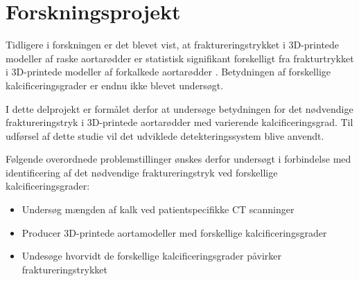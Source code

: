 \section{Forskningsprojekt}
Tidligere i forskningen er det blevet vist, at fraktureringstrykket i 3D-printede modeller af raske aortarødder er statistisk signifikant forskelligt fra frakturtrykket i 3D-printede modeller af forkalkede aortarødder \cite{rapport}. Betydningen af forskellige kalcificeringsgrader er endnu ikke blevet undersøgt. 

I dette delprojekt er formålet derfor at undersøge betydningen for det nødvendige fraktureringstryk i 3D-printede aortarødder med varierende kalcificeringsgrad. Til udførsel af dette studie vil det udviklede detekteringssystem blive anvendt. 

Følgende overordnede problemstillinger ønskes derfor undersøgt i forbindelse med identificering af det nødvendige fraktureringstryk ved forskellige kalcificeringsgrader:
\begin{itemize} 
	\item Undersøg mængden af kalk ved patientspecifikke CT scanninger
	\item Producer 3D-printede aortamodeller med forskellige kalcificeringsgrader
	\item Undesøge hvorvidt de forskellige kalcificeringsgrader påvirker fraktureringstrykket 
\end{itemize}







